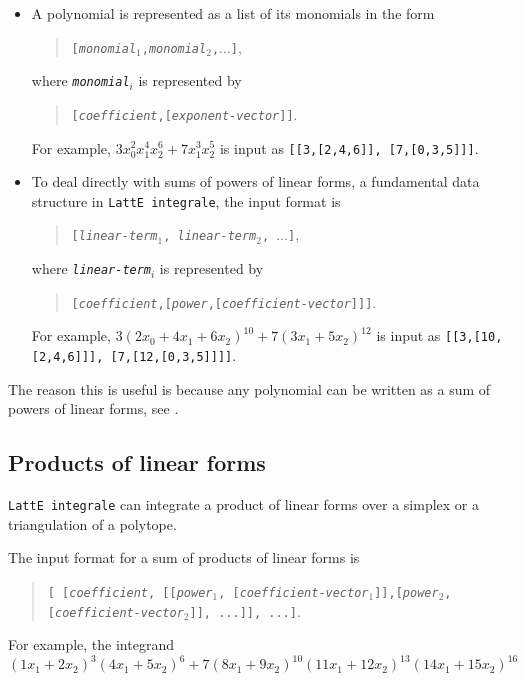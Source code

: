 \documentclass{article}
\newcommand{\latteInt}{{\tt LattE integrale}\xspace}
\begin{document}
\begin{itemize}
\item A polynomial is represented as a list of its monomials in the form
  \begin{quote}
    \texttt{[{\itshape monomial}$_1$,{\itshape monomial}$_2$,$\dots$]},
  \end{quote}
  where \texttt{{\itshape monomial}$_i$} is represented by
  \begin{quote}
    \texttt{[{\itshape coefficient},[{\itshape exponent-vector}]]}.
  \end{quote}
  For example, $3x_0^2x_1^4x_2^6 + 7x_1^3x_2^5$ is input as \texttt{[[3,[2,4,6]], [7,[0,3,5]]]}. 

\item To deal directly with sums of powers of linear forms, a fundamental data structure in \latteInt, the input format is 
  \begin{quote}
    \texttt{[{\itshape linear-term$_1$}, {\itshape linear-term$_2$}, $\dots$]},
    \end{quote}
    where \texttt{{\itshape linear-term}$_i$} is represented by
    \begin{quote}
      \texttt{[{\itshape coefficient},[{\itshape power},[{\itshape coefficient-vector}]]]}.
    \end{quote}
    For example, $3(2x_0 + 4x_1 + 6x_2)^{10} + 7(3x_1 + 5x_2)^{12}$ is input
    as \texttt{[[3,[10,[2,4,6]]], [7,[12,[0,3,5]]]]}. 
  \end{itemize}
  
The reason this is useful is because any polynomial can be written as a sum of powers of linear forms, see \cite{howToIntegratePolynomialSimplex}.


\subsection{Products of linear forms}

\latteInt can integrate a product of linear forms over a simplex or a triangulation of a polytope.

The input format for a sum of products of linear forms is
    \begin{quote}
      \texttt{[ [{\itshape coefficient}, [[{\itshape power$_1$}, [{\itshape coefficient-vector$_1$}]],[{\itshape power$_2$}, [{\itshape coefficient-vector$_2$}]], ...]],  ...]}.
    \end{quote}

For example, the integrand \[(1x_1 +2x_2)^3(4x_1 + 5x_2)^6 +7(8x_1 +9x_2)^{10}(11x_1 + 12x_2)^{13}(14x_1 +15x_2)^{16}\]
\end{document}
